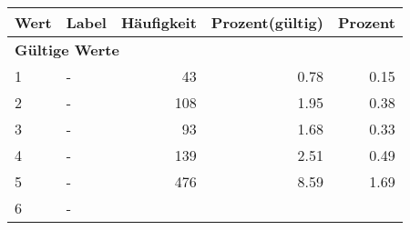      \begin{longtable}{lXrrr}
     \toprule
     \textbf{Wert} & \textbf{Label} & \textbf{Häufigkeit} & \textbf{Prozent(gültig)} & \textbf{Prozent} \\
     \endhead
     \midrule
     \multicolumn{5}{l}{\textbf{Gültige Werte}}\\

     1 &
     \multicolumn{1}{X}{ -  } &


       \num{43} &
       \num[round-mode=places,round-precision=2]{0.78} &
         \num[round-mode=places,round-precision=2]{0.15} \\

     2 &
     \multicolumn{1}{X}{ -  } &


       \num{108} &
       \num[round-mode=places,round-precision=2]{1.95} &
         \num[round-mode=places,round-precision=2]{0.38} \\

     3 &
     \multicolumn{1}{X}{ -  } &


       \num{93} &
       \num[round-mode=places,round-precision=2]{1.68} &
         \num[round-mode=places,round-precision=2]{0.33} \\

     4 &
     \multicolumn{1}{X}{ -  } &


       \num{139} &
       \num[round-mode=places,round-precision=2]{2.51} &
         \num[round-mode=places,round-precision=2]{0.49} \\

     5 &
     \multicolumn{1}{X}{ -  } &


       \num{476} &
       \num[round-mode=places,round-precision=2]{8.59} &
         \num[round-mode=places,round-precision=2]{1.69} \\

     6 &
     \multicolumn{1}{X}{ -  } &



\end{longtable}
